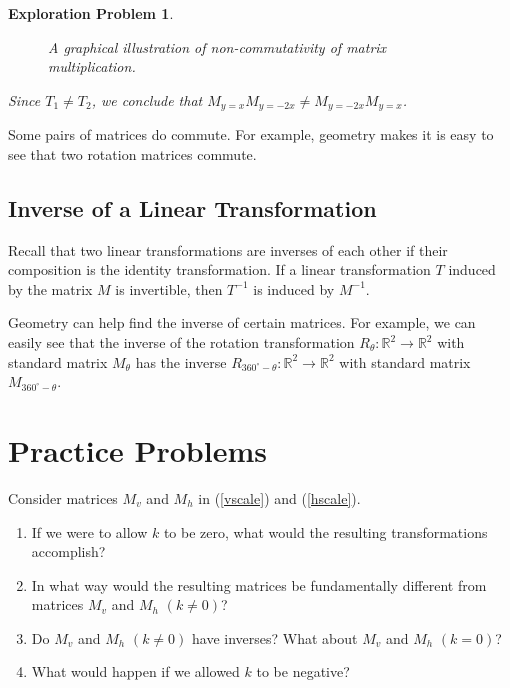\documentclass{ximera}
\newcommand{\RR}{\mathbb{R}}
\newtheorem{initprob}{Exploration Problem}
\begin{document}
\begin{initprob}
\begin{figure}[h]

\caption{A graphical illustration of non-commutativity of matrix multiplication.}
  \label{fig:reflectioncomp} 
\end{figure}

Since $T_1\neq T_2$, we conclude that $M_{y=x}M_{y=-2x}\neq M_{y=-2x}M_{y=x}$.

\end{initprob}

\begin{example}\label{ex:rotationscommute}
Some pairs of matrices do commute.  For example, geometry makes it is easy to see that two rotation matrices commute.
\end{example}




 
\subsection*{Inverse of a Linear Transformation}
Recall that two linear transformations are inverses of each other if their composition is the identity transformation.
If a linear transformation $T$ induced by the matrix $M$ is invertible, then $T^{-1}$ is induced by $M^{-1}$.  

Geometry can help find the inverse of certain matrices.  For example, we can easily see that the inverse of the rotation transformation $R_{\theta}:\RR^2\rightarrow \RR^2$ with standard matrix $M_{\theta}$ has the inverse $R_{360^{\circ}-\theta}:\RR^2\rightarrow \RR^2$ with standard matrix $M_{360^{\circ}-\theta}$.

\section*{Practice Problems}
\begin{problem}\label{prob:k0}
Consider matrices $M_v$ and $M_h$ in (\ref{vscale}) and (\ref{hscale}).  
\begin{enumerate}
\item
If we were to allow $k$ to be zero, what would the resulting transformations accomplish?  
\item In what way would the resulting matrices be fundamentally different from matrices $M_v$ and $M_h$ $(k\neq 0)$?  
\item Do $M_v$ and $M_h$ $(k\neq 0)$ have inverses?  What about $M_v$ and $M_h$ $(k= 0)$?  
\item What would happen if we allowed $k$ to be negative?
\end{enumerate}
\end{problem}
\end{document}
